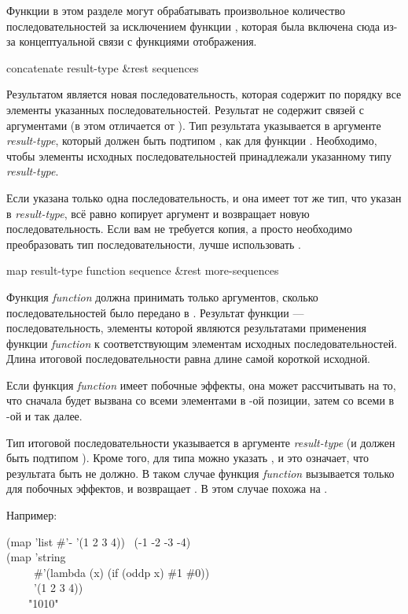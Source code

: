 Функции в этом разделе могут обрабатывать произвольное количество
последовательностей за исключением функции , которая была включена
сюда из-за концептуальной связи с функциями отображения.

\begin{defun}[Функция]
concatenate result-type &rest sequences

Результатом является новая последовательность, которая содержит по порядку все
элементы указанных последовательностей. Результат не содержит связей с
аргументами (в этом  отличается от ). Тип
результата указывается в аргументе \emph{result-type}, который должен быть
подтипом , как для функции .
Необходимо, чтобы элементы исходных последовательностей принадлежали указанному
типу \emph{result-type}.

Если указана только одна последовательность, и она имеет тот же тип, что
указан в \emph{result-type},  всё равно копирует аргумент и
возвращает новую последовательность. Если вам не требуется копия, а просто
необходимо преобразовать тип последовательности, лучше использовать
.
\end{defun}

\begin{defun}[Функция]
map result-type function sequence &rest more-sequences

Функция \emph{function} должна принимать только аргументов, сколько
последовательностей было передано в . 
Результат функции  --- последовательность, элементы которой являются
результатами применения функции \emph{function} к соответствующим элементам
исходных последовательностей. Длина итоговой последовательности равна длине
самой короткой исходной.

Если функция \emph{function} имеет побочные эффекты, она может рассчитывать на
то, что сначала будет вызвана со всеми элементами в -ой позиции, затем со
всеми в -ой и так далее.

Тип итоговой последовательности указывается в аргументе \emph{result-type} (и
должен быть подтипом ).
Кроме того, для типа можно указать {\nil}, и это означает, что результата быть
не должно. В таком случае функция \emph{function} вызывается только для побочных
эффектов, и  возвращает {\nil}. В этом случае  похожа на
.

Например:
\begin{lisp}
(map 'list \#'- '(1 2 3 4)) \EV\ (-1 -2 -3 -4) \\
(map 'string \\
~~~~~\#'(lambda (x) (if (oddp x) \#{\Xbackslash}1 \#{\Xbackslash}0)) \\
~~~~~'(1 2 3 4)) \\
~~~\EV\ "1010"
\end{lisp}
\end{defun}


